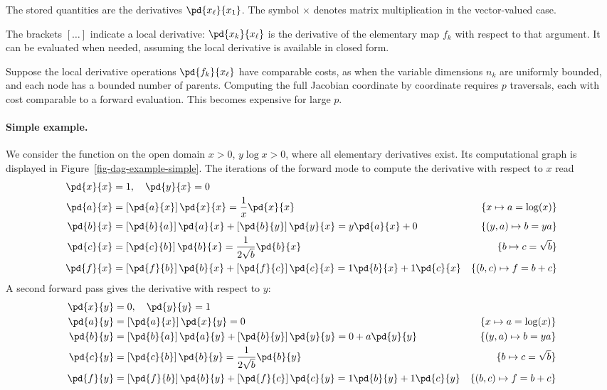 The stored quantities are the derivatives $\pd{x_\ell}{x_1}$. The symbol $\times$ denotes matrix multiplication in the vector-valued case.
 
The brackets $[\ldots]$ indicate a local derivative: $\pd{x_k}{x_\ell}$ is the derivative of the elementary map $f_k$ with respect to that argument. It can be evaluated when needed, assuming the local derivative is available in closed form.

Suppose the local derivative operations $\pd{f_k}{x_\ell}$ have comparable costs, as when the variable dimensions $n_k$ are uniformly bounded, and each node has a bounded number of parents. Computing the full Jacobian coordinate by coordinate requires $p$ traversals, each with cost comparable to a forward evaluation. This becomes expensive for large $p$.



   
\paragraph{Simple example.}


We consider the function
on the open domain $x>0$, $y\log x>0$, where all elementary derivatives exist. Its computational graph is displayed in Figure~\ref{fig-dag-example-simple}. The iterations of the forward mode to compute the derivative with respect to $x$ read
\begin{align*}
		\pd{x}{x} &= 1,  \quad \pd{y}{x} = 0 \\
		\pd{a}{x} &= \bk{\pd{a}{x}} \pd{x}{x} = \frac{1}{x} \pd{x}{x} &
			\{x \mapsto a = \log(x)\}\\
		\pd{b}{x} &= \bk{\pd{b}{a}} \pd{a}{x}  + \bk{\pd{b}{y}} \pd{y}{x}  = y \pd{a}{x} + 0 &
			\{(y,a) \mapsto b=ya\}\\
		\pd{c}{x} &= \bk{\pd{c}{b}} \pd{b}{x}  = \frac{1}{2\sqrt{b}} \pd{b}{x}&
			\{b \mapsto c=\sqrt{b}\} \\
		\pd{f}{x} &= \bk{\pd{f}{b}} \pd{b}{x} + \bk{\pd{f}{c}} \pd{c}{x}  = 1\pd{b}{x} + 1\pd{c}{x}&
			\{(b,c) \mapsto f=b+c\}
\end{align*}
A second forward pass gives the derivative with respect to $y$:
\begin{align*}
		\pd{x}{y} &= 0,  \quad \pd{y}{y} = 1 \\
		\pd{a}{y} &= \bk{\pd{a}{x}} \pd{x}{y} = 0 &
			\{x \mapsto a = \log(x)\}\\
		\pd{b}{y} &= \bk{\pd{b}{a}} \pd{a}{y}  + \bk{\pd{b}{y}} \pd{y}{y}  = 0 + a \pd{y}{y}  &
			\{(y,a) \mapsto b=ya\}\\
		\pd{c}{y} &= \bk{\pd{c}{b}} \pd{b}{y}  = \frac{1}{2\sqrt{b}} \pd{b}{y}&
			\{b \mapsto c=\sqrt{b}\} \\
		\pd{f}{y} &= \bk{\pd{f}{b}} \pd{b}{y} + \bk{\pd{f}{c}} \pd{c}{y}  = 1\pd{b}{y} + 1\pd{c}{y}&
			\{(b,c) \mapsto f=b+c\}
\end{align*}



